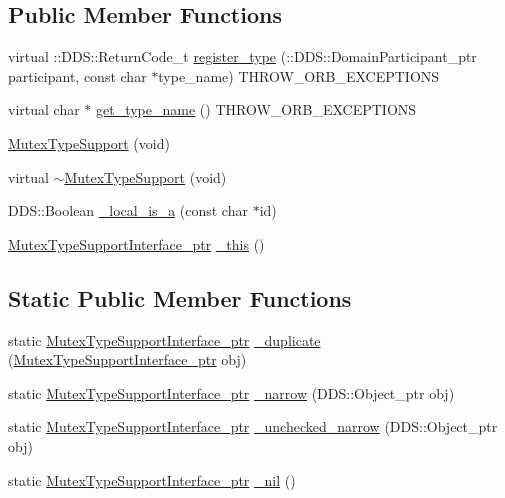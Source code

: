 \subsection*{Public Member Functions}
\begin{DoxyCompactItemize}
\item 
virtual ::DDS::ReturnCode\_\-t \hyperlink{classKnowledge_1_1MutexTypeSupport_a967e297ad54a63b6998a71747a784413}{register\_\-type} (::DDS::DomainParticipant\_\-ptr participant, const char $\ast$type\_\-name) THROW\_\-ORB\_\-EXCEPTIONS
\item 
virtual char $\ast$ \hyperlink{classKnowledge_1_1MutexTypeSupport_a0578fd419dc9d6b588e2a99c15e08a2c}{get\_\-type\_\-name} () THROW\_\-ORB\_\-EXCEPTIONS
\item 
\hyperlink{classKnowledge_1_1MutexTypeSupport_a29e41fa0b6403f5bfa448f873490a401}{MutexTypeSupport} (void)
\item 
virtual \hyperlink{classKnowledge_1_1MutexTypeSupport_a9bb9c5a170c853f26bdac427879fafb6}{$\sim$MutexTypeSupport} (void)
\item 
DDS::Boolean \hyperlink{classKnowledge_1_1MutexTypeSupportInterface_af6fbc4387f2ece8048668e645fb01738}{\_\-local\_\-is\_\-a} (const char $\ast$id)
\item 
\hyperlink{classKnowledge_1_1MutexTypeSupportInterface}{MutexTypeSupportInterface\_\-ptr} \hyperlink{classKnowledge_1_1MutexTypeSupportInterface_a989994179337e5d8a48415edd788ab07}{\_\-this} ()
\end{DoxyCompactItemize}
\subsection*{Static Public Member Functions}
\begin{DoxyCompactItemize}
\item 
static \hyperlink{classKnowledge_1_1MutexTypeSupportInterface}{MutexTypeSupportInterface\_\-ptr} \hyperlink{classKnowledge_1_1MutexTypeSupportInterface_ac4301f1cd3f8a0d6dfc6c4094e405b4b}{\_\-duplicate} (\hyperlink{classKnowledge_1_1MutexTypeSupportInterface}{MutexTypeSupportInterface\_\-ptr} obj)
\item 
static \hyperlink{classKnowledge_1_1MutexTypeSupportInterface}{MutexTypeSupportInterface\_\-ptr} \hyperlink{classKnowledge_1_1MutexTypeSupportInterface_a924161ab92405d5c61f18bca1bda6c9a}{\_\-narrow} (DDS::Object\_\-ptr obj)
\item 
static \hyperlink{classKnowledge_1_1MutexTypeSupportInterface}{MutexTypeSupportInterface\_\-ptr} \hyperlink{classKnowledge_1_1MutexTypeSupportInterface_a52d5fbe72b04d4b33c3db4f866ae18b5}{\_\-unchecked\_\-narrow} (DDS::Object\_\-ptr obj)
\item 
static \hyperlink{classKnowledge_1_1MutexTypeSupportInterface}{MutexTypeSupportInterface\_\-ptr} \hyperlink{classKnowledge_1_1MutexTypeSupportInterface_afc54d77df8f3c9cd8063120a0a2a3089}{\_\-nil} ()
\end{DoxyCompactItemize}
